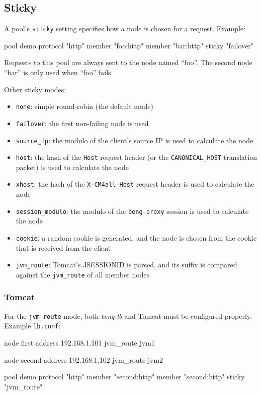 \documentclass[a4paper,12pt]{article}
\begin{document}
\subsection{Sticky}
\label{sticky}

A pool's \verb|sticky| setting specifies how a node is chosen for a
request.  Example:

\begin{verbatim*}
pool demo {
  protocol "http"
  member "foo:http"
  member "bar:http"
  sticky "failover"
}
\end{verbatim*}

Requests to this pool are always sent to the node named ``foo''.  The
second node ``bar'' is only used when ``foo'' fails.

Other sticky modes:

\begin{itemize}
\item \texttt{none}: simple round-robin (the default mode)
\item \texttt{failover}: the first non-failing node is used
\item \verb|source_ip|: the modulo of the client's source IP is used
  to calculate the node
\item \verb|host|: the hash of the \texttt{Host} request header (or
  the \verb|CANONICAL_HOST| translation packet) is used to calculate
  the node
\item \verb|xhost|: the hash of the \texttt{X-CM4all-Host} request
  header is used to calculate the node
\item \texttt{session\_modulo}: the modulo of the \texttt{beng-proxy}
  session is used to calculate the node
\item \texttt{cookie}: a random cookie is generated, and the node is
  chosen from the cookie that is received from the client
\item \verb|jvm_route|: Tomcat's JSESSIONID is parsed, and its suffix
  is compared against the \verb|jvm_route| of all member nodes
\end{itemize}

\subsubsection{Tomcat}

For the \verb|jvm_route| mode, both \emph{beng-lb} and Tomcat must be
configured properly.  Example \texttt{lb.conf}:

\begin{verbatim*}
node first {
   address 192.168.1.101
   jvm_route jvm1
}

node second {
   address 192.168.1.102
   jvm_route jvm2
}

pool demo {
  protocol "http"
  member "second:http"
  member "second:http"
  sticky "jvm_route"
}
\end{verbatim*}
\end{document}
